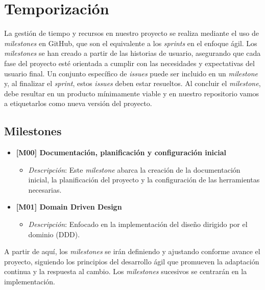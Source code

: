 \section{Temporización}

La gestión de tiempo y recursos en nuestro proyecto se realiza mediante el uso de \textit{milestones} en GitHub, que son el equivalente a los \textit{sprints} en el enfoque ágil. Los \textit{milestones} se han creado a partir de las historias de usuario, asegurando que cada fase del proyecto esté orientada a cumplir con las necesidades y expectativas del usuario final. Un conjunto específico de \textit{issues} puede ser incluido en un \textit{milestone} y, al finalizar el \textit{sprint}, estos \textit{issues} deben estar resueltos. Al concluir el \textit{milestone}, debe resultar en un producto mínimamente viable y en nuestro repositorio vamos a etiquetarlos como nueva versión del proyecto.

\subsection{Milestones}

\begin{itemize}
    \item \textbf{[M00] \- Documentación, planificación y configuración inicial}
    \begin{itemize}
        \item \textit{Descripción}: Este \textit{milestone} abarca la creación de la documentación inicial, la planificación del proyecto y la configuración de las herramientas necesarias.
    \end{itemize}

    \item \textbf{[M01] \- Domain Driven Design}
    \begin{itemize}
        \item \textit{Descripción}: Enfocado en la implementación del diseño dirigido por el dominio (DDD).
    \end{itemize}
\end{itemize}

A partir de aquí, los \textit{milestones} se irán definiendo y ajustando conforme avance el proyecto, siguiendo los principios del desarrollo ágil que promueven la adaptación continua y la respuesta al cambio. Los \textit{milestones} sucesivos se centrarán en la implementación.
